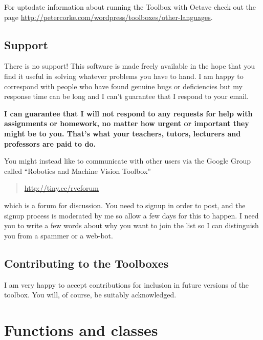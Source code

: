 \documentclass[a4paper,twoside]{report}
\makeatletter
\newcommand\funcsection{%
\@startsection{section}{1}{\z@}%
  {-3.5ex \@plus -1ex \@minus -.2ex}%
  {2.3ex \@plus.2ex}%
  {\color{red}\sffamily\huge\bfseries}}
\makeatother
\begin{document}
For uptodate information about running the Toolbox with Octave check out the page \url{http://petercorke.com/wordpress/toolboxes/other-languages}.



\section{Support}
There is no support!  This software is made freely available in the hope that you find it useful in solving whatever problems
you have to hand.
I am happy to correspond with people who have found genuine
bugs or deficiencies but my response time can be long and I can't guarantee that I respond to your email.

\textbf{I can guarantee that I will not respond to any requests for help with assignments or homework, no matter
how urgent or important they might be to you.  That's what your teachers, tutors, lecturers and professors are paid to do.}

You might instead like to communicate with other users via 
the Google Group called ``Robotics and Machine Vision Toolbox'' 
\begin{quote}
\url{http://tiny.cc/rvcforum}
\end{quote}
which is a forum for discussion.
You need to signup in order to post, and the signup process is moderated by me so allow a few
days for this to happen.  I need you to write a few words about why you want to join the list
so I can distinguish you from a spammer or a web-bot.



\section{Contributing to the Toolboxes}
I am very happy to accept contributions for inclusion in future versions of the
toolbox.  You will, of course, be suitably acknowledged.

\renewcommand{\section}{\funcsection}
\newpage
\chapter{Functions and classes}



\end{document}
